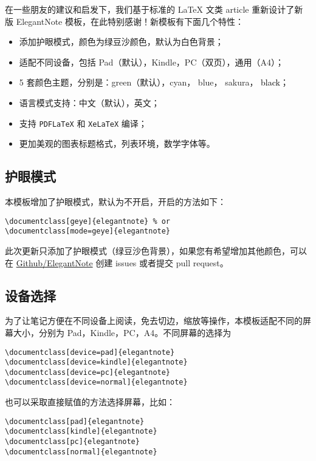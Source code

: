 \documentclass[cn,pad,11pt,green,geye]{../elegantnote}
\begin{document}
在一些朋友的建议和启发下，我们基于标准的 \LaTeX{} 文类 article 重新设计了新版 ElegantNote 模板，在此特别感谢！新模板有下面几个特性：
\begin{itemize}
\item 添加护眼模式，颜色为绿豆沙颜色，默认为白色背景；
\item 适配不同设备，包括 Pad（默认），Kindle，PC（双页），通用（A4）；
\item 5 套颜色主题，分别是：\textcolor{egreen}{green}（默认），\textcolor{ecyan}{cyan}， \textcolor{eblue}{blue}， \textcolor{sakura}{sakura}， \textcolor{black}{black}；
\item 语言模式支持：中文（默认），英文；
\item 支持 \lstinline{PDFLaTeX} 和 \lstinline{XeLaTeX} 编译；
\item 更加美观的图表标题格式，列表环境，数学字体等。
\end{itemize}

\subsection{护眼模式}
本模板增加了护眼模式，默认为不开启，开启的方法如下：
\begin{lstlisting}[frame=none]  
\documentclass[geye]{elegantnote} % or
\documentclass[mode=geye]{elegantnote}
\end{lstlisting}

\begin{remark}
此次更新只添加了护眼模式（绿豆沙色背景），如果您有希望增加其他颜色，可以在 \href{https://github.com/ElegantLaTeX/ElegantNote}{Github/ElegantNote} 创建 issues 或者提交 pull request。
\end{remark}

\subsection{设备选择}
为了让笔记方便在不同设备上阅读，免去切边，缩放等操作，本模板适配不同的屏幕大小，分别为 Pad，Kindle，PC，A4。不同屏幕的选择为
\begin{lstlisting}[frame=none]  
\documentclass[device=pad]{elegantnote}
\documentclass[device=kindle]{elegantnote}
\documentclass[device=pc]{elegantnote}
\documentclass[device=normal]{elegantnote}
\end{lstlisting}
\begin{note}
也可以采取直接赋值的方法选择屏幕，比如：
\end{note}
\begin{lstlisting}[frame=none]  
\documentclass[pad]{elegantnote}
\documentclass[kindle]{elegantnote}
\documentclass[pc]{elegantnote}
\documentclass[normal]{elegantnote}
\end{lstlisting}
\end{document}
